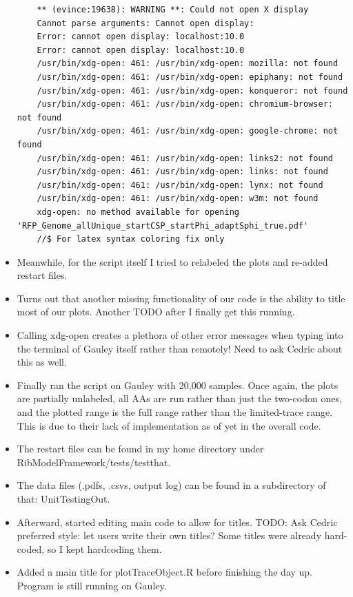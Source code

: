 \documentclass[12pt,hyperref]{labbook}
\newcommand{\sep}{\discretionary{}{}{}} %
\begin{document}
\begin{itemize}
\begin{lstlisting}
    ** (evince:19638): WARNING **: Could not open X display
    Cannot parse arguments: Cannot open display: 
    Error: cannot open display: localhost:10.0
    Error: cannot open display: localhost:10.0
    /usr/bin/xdg-open: 461: /usr/bin/xdg-open: mozilla: not found
    /usr/bin/xdg-open: 461: /usr/bin/xdg-open: epiphany: not found
    /usr/bin/xdg-open: 461: /usr/bin/xdg-open: konqueror: not found
    /usr/bin/xdg-open: 461: /usr/bin/xdg-open: chromium-browser: not found
    /usr/bin/xdg-open: 461: /usr/bin/xdg-open: google-chrome: not found
    /usr/bin/xdg-open: 461: /usr/bin/xdg-open: links2: not found
    /usr/bin/xdg-open: 461: /usr/bin/xdg-open: links: not found
    /usr/bin/xdg-open: 461: /usr/bin/xdg-open: lynx: not found
    /usr/bin/xdg-open: 461: /usr/bin/xdg-open: w3m: not found
    xdg-open: no method available for opening 'RFP_Genome_allUnique_startCSP_startPhi_adaptSphi_true.pdf'
    //$ For latex syntax coloring fix only
    \end{lstlisting}
    \item Meanwhile, for the script itself I tried to relabeled the plots and re-added restart files.
    \item Turns out that another missing functionality of our code is the ability to title most of our plots. 
    Another TODO after I finally get this running.
    \item Calling xdg-open creates a plethora of other error messages when typing into the terminal of Gauley itself rather than remotely! 
    Need to ask Cedric about this as well.
    \item Finally ran the script on Gauley with 20,000 samples.
    Once again, the plots are partially unlabeled, all AAs are run rather than just the two-codon ones, and the plotted range is the full range rather than the limited-trace range.
    This is due to their lack of implementation as of yet in the overall code.
    \item The restart files can be found in my home directory under Rib\sep Model\sep Framework\sep/\sep tests\sep /\sep testthat\sep.
    \item The data files (.pdfs, .csvs, output log) can be found in a subdirectory of that: Unit\sep Testing\sep Out.
    \item Afterward, started editing main code to allow for titles.
    TODO: Ask Cedric preferred style: let users write their own titles?
    Some titles were already hard-coded, so I kept hardcoding them.
    \item Added a main title for plotTraceObject.R before finishing the day up.
    Program is still running on Gauley.
\end{itemize}
\end{document}
